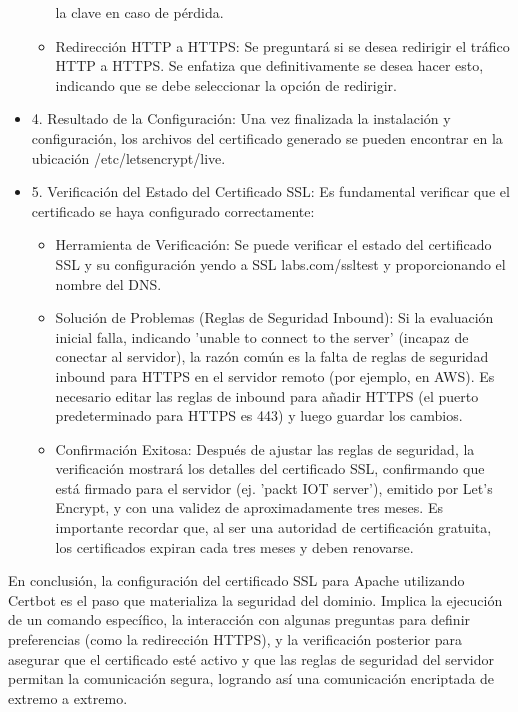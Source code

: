 \documentclass{report}
\begin{document}
\begin{itemize}
\begin{itemize}
            la clave en caso de pérdida.
            \item Redirección HTTP a HTTPS: Se preguntará si se desea redirigir el tráfico HTTP a HTTPS. Se enfatiza que definitivamente 
            se desea hacer esto, indicando que se debe seleccionar la opción de redirigir.
        \end{itemize}
    \item 4. Resultado de la Configuración: Una vez finalizada la instalación y configuración, los archivos del certificado generado se pueden 
    encontrar en la ubicación /etc/letsencrypt/live.
    \item 5. Verificación del Estado del Certificado SSL: Es fundamental verificar que el certificado se haya configurado correctamente:
        \begin{itemize}
            \item Herramienta de Verificación: Se puede verificar el estado del certificado SSL y su configuración yendo a SSL labs.com/ssltest 
            y proporcionando el nombre del DNS.
            \item Solución de Problemas (Reglas de Seguridad Inbound): Si la evaluación inicial falla, indicando 'unable to connect to the server' 
            (incapaz de conectar al servidor), la razón común es la falta de reglas de seguridad inbound para HTTPS en el servidor remoto 
            (por ejemplo, en AWS). Es necesario editar las reglas de inbound para añadir HTTPS (el puerto predeterminado para HTTPS es 443) y 
            luego guardar los cambios.
            \item Confirmación Exitosa: Después de ajustar las reglas de seguridad, la verificación mostrará los detalles del certificado SSL, 
            confirmando que está firmado para el servidor (ej. 'packt IOT server'), emitido por Let's Encrypt, y con una validez de 
            aproximadamente tres meses. Es importante recordar que, al ser una autoridad de certificación gratuita, los certificados 
            expiran cada tres meses y deben renovarse.        
        \end{itemize}
\end{itemize}
En conclusión, la configuración del certificado SSL para Apache utilizando Certbot es el paso que materializa la seguridad del 
dominio. Implica la ejecución de un comando específico, la interacción con algunas preguntas para definir preferencias 
(como la redirección HTTPS), y la verificación posterior para asegurar que el certificado esté activo y que las reglas de seguridad 
del servidor permitan la comunicación segura, logrando así una comunicación encriptada de extremo a extremo.
\end{document}
